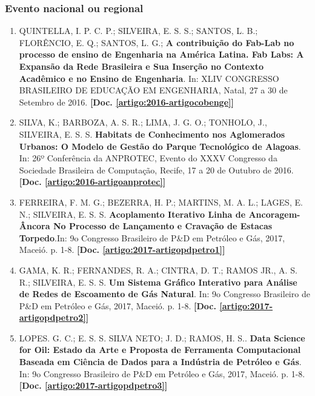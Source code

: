 \documentclass[a4paper,oneside,10pt]{article}
\begin{document}
\subsubsection{Evento nacional ou regional}
\vspace{0.3cm}
\begin{enumerate}
\renewcommand{\labelenumi}{{\large\bfseries\arabic{enumi}.}}

\item QUINTELLA, I. P. C. P.; SILVEIRA, E. S. S.; SANTOS, L. B.; FLORÊNCIO, E. Q.; SANTOS, L. G.; \textbf{A contribuição do Fab-Lab no processo de ensino de Engenharia na América Latina. Fab Labs: A Expansão da Rede Brasileira e Sua Inserção no Contexto Acadêmico e no Ensino de Engenharia}. In: XLIV CONGRESSO BRASILEIRO DE EDUCAÇÃO EM ENGENHARIA, Natal, 27 a 30 de Setembro de 2016. \textbf{[Doc. \ref{artigo:2016-artigocobenge}]}

\item SILVA, K.; BARBOZA, A. S. R.; LIMA, J. G. O.;   TONHOLO, J., SILVEIRA, E. S. S. \textbf{Habitats de Conhecimento nos Aglomerados Urbanos: O Modelo de Gestão do Parque Tecnológico de Alagoas}. In: 26º Conferência da ANPROTEC, Evento do XXXV Congresso da Sociedade Brasileira de Computação, Recife, 17 a 20 de Outubro de 2016. \textbf{[Doc. \ref{artigo:2016-artigoanprotec}]}

\item FERREIRA, F. M. G.; BEZERRA, H. P.;  MARTINS, M. A. L.; LAGES, E. N.; SILVEIRA, E. S. S. \textbf{Acoplamento Iterativo Linha de Ancoragem-Âncora No Processo de Lançamento e Cravação de Estacas Torpedo}.In: 9o Congresso Brasileiro de P\&D em Petróleo e Gás, 2017, Maceió. p. 1-8.  \textbf{[Doc. \ref{artigo:2017-artigopdpetro1}]}

\item GAMA, K. R.; FERNANDES, R. A.;  CINTRA, D. T.; RAMOS JR., A. S. R.; SILVEIRA, E. S. S. \textbf{Um Sistema Gráfico Interativo para Análise de Redes de Escoamento de  Gás Natural}. In: 9o Congresso Brasileiro de P\&D em Petróleo e Gás, 2017, Maceió. p. 1-8.  \textbf{[Doc. \ref{artigo:2017-artigopdpetro2}]}

\item LOPES. G. C.;  E. S. S. SILVA NETO; J. D.; RAMOS, H. S.. \textbf{Data Science for Oil: Estado da Arte e Proposta de Ferramenta Computacional Baseada em Ciência de Dados para a Indústria de Petróleo e Gás}. In: 9o Congresso Brasileiro de P\&D em Petróleo e Gás, 2017, Maceió. p. 1-8.  \textbf{[Doc. \ref{artigo:2017-artigopdpetro3}]}


\end{enumerate}
\end{document}
